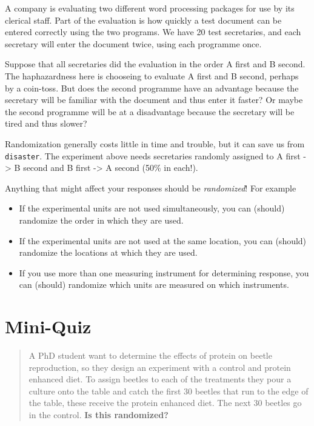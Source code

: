 \documentclass[
]{book}
\providecommand{\tightlist}{%
  \setlength{\itemsep}{0pt}\setlength{\parskip}{0pt}}
\begin{document}
A company is evaluating two different word processing packages for use by its clerical staff. Part of the evaluation is how quickly a test document can be entered correctly using the two programs. We have 20 test secretaries, and each secretary will enter the document twice, using each programme once.

Suppose that all secretaries did the evaluation in the order A first and B second. The haphazardness here is chooseing to evaluate A first and B second, perhaps by a coin-toss. But does the second programme have an advantage because the secretary will be familiar with the document and thus enter it faster? Or maybe the second programme will be at a disadvantage because the secretary will be tired and thus slower?

Randomization generally costs little in time and trouble, but it can save us from \texttt{disaster}. The experiment above needs secretaries randomly assigned to A first -\textgreater{} B second and B first -\textgreater{} A second (50\% in each!).

Anything that might affect your responses should be \emph{randomized}! For example

\begin{itemize}
\tightlist
\item
  If the experimental units are not used simultaneously, you can (should) randomize the order in which they are used.
\item
  If the experimental units are not used at the same location, you can (should) randomize the locations at which they are used.
\item
  If you use more than one measuring instrument for determining response, you can (should) randomize which units are measured on which instruments.
\end{itemize}

\section{Mini-Quiz}\label{mini-quiz}

\begin{quote}
A PhD student want to determine the effects of protein on beetle reproduction, so they design an experiment with a control and protein enhanced diet. To assign beetles to each of the treatments they pour a culture onto the table and catch the first 30 beetles that run to the edge of the table, these receive the protein enhanced diet. The next 30 beetles go in the control. \textbf{Is this randomized?}
\end{quote}
\end{document}

